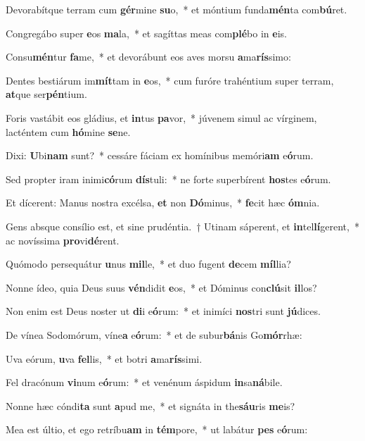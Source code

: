 \item Devorabítque terram cum \textbf{gér}mine \textbf{su}o,~* et móntium funda\textbf{mén}ta com\textbf{bú}ret.
\item Congregábo super \textbf{e}os \textbf{ma}la,~* et sagíttas meas com\textbf{plé}bo in \textbf{e}is.
\item Consu\textbf{mén}tur \textbf{fa}me,~* et devorábunt eos aves morsu \textbf{a}ma\textbf{rís}simo:
\item Dentes bestiárum im\textbf{mít}tam in \textbf{e}os,~* cum furóre trahéntium super terram, \textbf{at}que ser\textbf{pén}tium.
\item Foris vastábit eos gládius, et \textbf{in}tus \textbf{pa}vor,~* júvenem simul ac vírginem, lacténtem cum \textbf{hó}mine \textbf{se}ne.
\item Dixi: \textbf{U}bi\textbf{nam} sunt?~* cessáre fáciam ex homínibus memóri\textbf{am} e\textbf{ó}rum.
\item Sed propter iram inimi\textbf{có}rum \textbf{dís}tuli:~* ne forte superbírent \textbf{hos}tes e\textbf{ó}rum.
\item Et dícerent: Manus nostra excélsa, \textbf{et} non \textbf{Dó}minus,~* \textbf{fe}cit hæc \textbf{óm}nia.
\item Gens absque consílio est, et sine prudéntia.~† Utinam sáperent, et \textbf{in}tel\textbf{lí}gerent,~* ac novíssima \textbf{pro}vi\textbf{dé}rent.
\item Quómodo persequátur \textbf{u}nus \textbf{mil}le,~* et duo fugent \textbf{de}cem \textbf{míl}lia?
\item Nonne ídeo, quia Deus suus \textbf{vén}didit \textbf{e}os,~* et Dóminus con\textbf{clú}sit \textbf{il}los?
\item Non enim est Deus noster ut \textbf{di}i e\textbf{ó}rum:~* et inimíci \textbf{nos}tri sunt \textbf{jú}dices.
\item De vínea Sodomórum, víne\textbf{a} e\textbf{ó}rum:~* et de subur\textbf{bá}nis Go\textbf{mór}rhæ:
\item Uva eórum, \textbf{u}va \textbf{fel}lis,~* et botri \textbf{a}ma\textbf{rís}simi.
\item Fel dracónum \textbf{vi}num e\textbf{ó}rum:~* et venénum áspidum \textbf{in}sa\textbf{ná}bile.
\item Nonne hæc cóndi\textbf{ta} sunt \textbf{a}pud me,~* et signáta in the\textbf{sáu}ris \textbf{me}is?
\item Mea est últio, et ego retríbu\textbf{am} in \textbf{tém}pore,~* ut labátur \textbf{pes} e\textbf{ó}rum:

